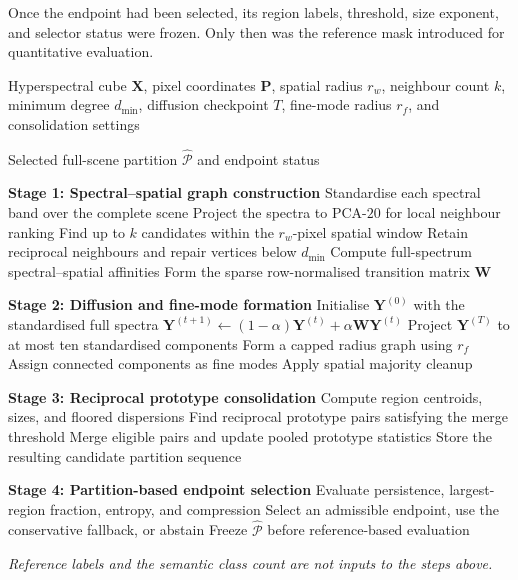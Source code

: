 \documentclass[10pt,a4paper,fleqn]{article}
\begin{document}
Once the endpoint had been selected, its region labels, threshold, size
exponent, and selector status were frozen. Only then was the reference mask
introduced for quantitative evaluation.

\begin{algorithm}[!t]
\caption{Graph-RMS full-scene region discovery}
\label{alg:graphrms}
\small

\begin{algorithmic}

\Require
\parbox[t]{0.82\linewidth}{
Hyperspectral cube \(\mathbf{X}\), pixel coordinates \(\mathbf{P}\),
spatial radius \(r_w\), neighbour count \(k\), minimum degree
\(d_{\min}\), diffusion checkpoint \(T\), fine-mode radius \(r_f\),
and consolidation settings
}

\Ensure
\parbox[t]{0.82\linewidth}{
Selected full-scene partition \(\widehat{\mathcal{P}}\) and endpoint status
}

\Statex
\Statex \textbf{Stage 1: Spectral--spatial graph construction}
\State Standardise each spectral band over the complete scene
\State Project the spectra to PCA-\(20\) for local neighbour ranking
\State Find up to \(k\) candidates within the \(r_w\)-pixel spatial window
\State Retain reciprocal neighbours and repair vertices below \(d_{\min}\)
\State Compute full-spectrum spectral--spatial affinities
\State Form the sparse row-normalised transition matrix \(\mathbf{W}\)

\Statex
\Statex \textbf{Stage 2: Diffusion and fine-mode formation}
\State Initialise \(\mathbf{Y}^{(0)}\) with the standardised full spectra
    \State
    \(\mathbf{Y}^{(t+1)}
    \gets
    (1-\alpha)\mathbf{Y}^{(t)}
    +
    \alpha\mathbf{W}\mathbf{Y}^{(t)}\)
\EndFor
\State Project \(\mathbf{Y}^{(T)}\) to at most ten standardised components
\State Form a capped radius graph using \(r_f\)
\State Assign connected components as fine modes
\State Apply spatial majority cleanup

\Statex
\Statex \textbf{Stage 3: Reciprocal prototype consolidation}
    \State Compute region centroids, sizes, and floored dispersions
    \Repeat
        \State Find reciprocal prototype pairs satisfying the merge threshold
        \State Merge eligible pairs and update pooled prototype statistics
    \State Store the resulting candidate partition sequence
\EndFor

\Statex
\Statex \textbf{Stage 4: Partition-based endpoint selection}
\State Evaluate persistence, largest-region fraction, entropy, and compression
\State Select an admissible endpoint, use the conservative fallback, or abstain
\State Freeze \(\widehat{\mathcal{P}}\) before reference-based evaluation

\Statex
\Statex \textit{Reference labels and the semantic class count are not inputs to the steps above.}

\end{algorithmic}
\end{algorithm}
\end{document}
